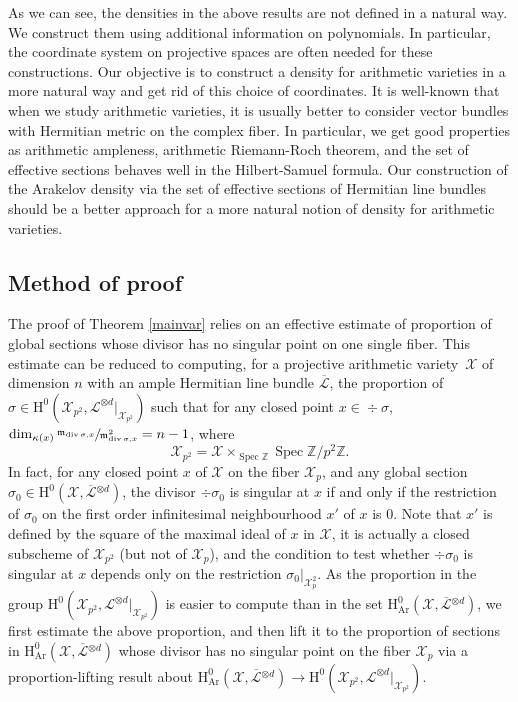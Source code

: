 \documentclass[11pt]{article}
\numberwithin{equation}{section}
\theoremstyle{plain}
\theoremstyle{definition}
\newcommand{\ho}{\mathrm{H}}
\newcommand{\m}{\mathfrak{m}}
\newcommand{\X}{\mathcal{X}}
\newcommand{\Li}{\overline{\mathcal{L}}{}}
\newcommand{\li}{\mathcal{L}}
\newcommand{\Z}{\mathbb{Z}}
\DeclareMathOperator{\Spec}{Spec}
\begin{document}
As we can see, the densities in the above results are not defined in a natural way. We construct them using additional information on polynomials. In particular, the coordinate system on projective spaces are often needed for these constructions. Our objective is to construct a density for arithmetic varieties in a more natural way and get rid of this choice of coordinates. It is well-known that when we study arithmetic varieties, it is usually better to consider vector bundles with Hermitian metric on the complex fiber. In particular, we get good properties as arithmetic ampleness, arithmetic Riemann-Roch theorem, and the set of effective sections behaves well in the Hilbert-Samuel formula. Our construction of the Arakelov density via the set of effective sections of Hermitian line bundles should be a better approach for a more natural notion of density for arithmetic varieties.

\subsection{Method of proof}
The proof of Theorem \ref{mainvar} relies on an effective \hbox{estimate} of proportion of global sections whose divisor has no singular point on one \hbox{single} fiber. This estimate can be reduced to computing, for a projective arithmetic variety~$\X$ of dimension $n$ with an ample Hermitian line bundle $\Li$, the proportion of $\sigma\!\in\! \ho^0(\X_{p^2}, \li^{\otimes d}|_{\X_{p^2}})$ such that for any closed point $x\!\in\!\div \sigma$, $\dim_{\kappa(x)}\sfrac{\m_{\div \sigma,x}}{\m^2_{\div \sigma, x}}=n-1$, where
\[
\X_{p^2}=\X\times_{\Spec \Z}\Spec \Z/p^2\Z.
\]
In fact, for any closed point $x$ of $\X$ on the fiber $\X_p$, and any global section $\sigma_0\in \ho^0(\X, \Li^{\otimes d})$, the divisor $\div \sigma_0$ is singular at $x$ if and only if the restriction of $\sigma_0$ on the first order infinitesimal neighbourhood $x'$ of $x$ is $0$. Note that $x'$ is defined by the square of the maximal ideal of $x$ in $\X$, it is actually a closed subscheme of $\X_{p^2}$ (but not of $\X_p$), and the condition to test whether $\div \sigma_0$ is singular at $x$ depends only on the restriction $\sigma_0|_{\X_p^2}$. As the proportion in the group $\ho^0(\X_{p^2}, \li^{\otimes d}|_{\X_{p^2}})$ is easier to compute than in the set $\ho^0_{\mathrm{Ar}}(\X, \Li^{\otimes d})$, we first estimate the above proportion, and then lift it to the proportion of sections in $\ho^0_{\mathrm{Ar}}(\X, \Li^{\otimes d})$ whose divisor has no singular point on the fiber $\X_p$ via a proportion-lifting result about $\ho^0_{\mathrm{Ar}}(\X, \Li^{\otimes d})\to \ho^0(\X_{p^2}, \li^{\otimes d}|_{\X_{p^2}})$.
\end{document}
